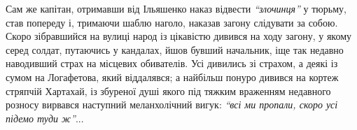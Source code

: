 \documentclass[a4paper,20pt]{report}
\begin{document}
Сам же капітан, отримавши від Ільяшенко наказ відвести \emph{``злочинця''} у тюрьму,
став попереду і, тримаючи шаблю наголо, наказав загону слідувати за собою. Скоро
зібравшийся на вулиці народ із цікавістю дивився на ходу загону, у якому
серед солдат, путаючись у кандалах, йшов бувший начальник, іще так недавно
наводивший страх на місцевих обивателів. Усі дивились зі страхом, а деякі із сумом на Логафетова,
який віддалявся; а найбільш понуро дивився на кортеж стряпчій Хартахай, із збуреної душі
якого під тяжким враженням недавного розносу вирвався наступний меланхолічний 
вигук: \emph{``всі ми пропали, скоро усі підемо туди ж''}...
\end{document}
